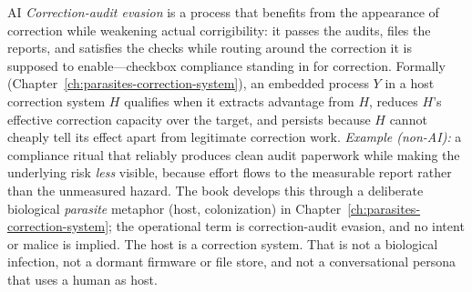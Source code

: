 \begin{authbar}{AI}
\emph{Correction-audit evasion} is a process that benefits from the appearance of correction while weakening actual corrigibility: it passes the audits, files the reports, and satisfies the checks while routing around the correction it is supposed to enable---checkbox compliance standing in for correction.
Formally (Chapter~\ref{ch:parasites-correction-system}), an embedded process \(Y\) in a host correction system \(H\) qualifies when it extracts advantage from \(H\), reduces \(H\)'s effective correction capacity over the target, and persists because \(H\) cannot cheaply tell its effect apart from legitimate correction work.
\emph{Example (non-AI):} a compliance ritual that reliably produces clean audit paperwork while making the underlying risk \emph{less} visible, because effort flows to the measurable report rather than the unmeasured hazard.
The book develops this through a deliberate biological \emph{parasite} metaphor (host, colonization) in Chapter~\ref{ch:parasites-correction-system}; the operational term is correction-audit evasion, and no intent or malice is implied.
The host is a correction system.
That is not a biological infection, not a dormant firmware or file store, and not a conversational persona that uses a human as host.

\end{authbar}
\authbarneedspace
